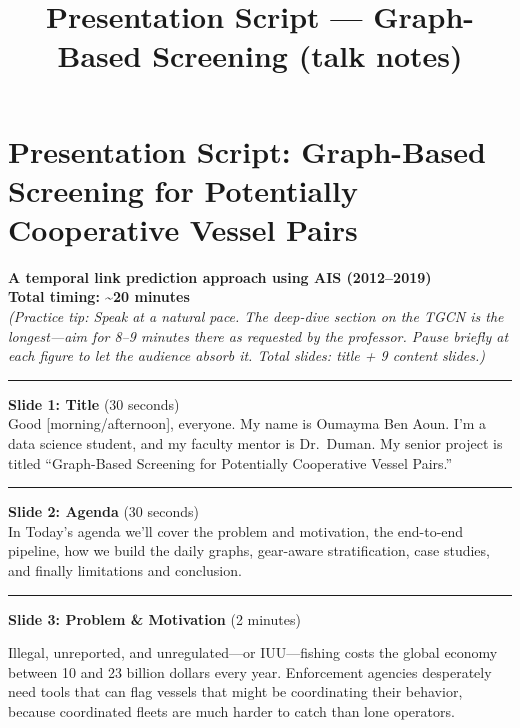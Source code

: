 \documentclass[
]{article}
\title{Presentation Script --- Graph-Based Screening (talk notes)}
\author{}
\date{}
\begin{document}
\maketitle

\section{Presentation Script: Graph-Based Screening for Potentially
Cooperative Vessel
Pairs}\label{presentation-script-graph-based-screening-for-potentially-cooperative-vessel-pairs}

\textbf{A temporal link prediction approach using AIS (2012--2019)}\\
\textbf{Total timing: \textasciitilde20 minutes}\\
\emph{(Practice tip: Speak at a natural pace. The deep-dive section on
the TGCN is the longest---aim for 8--9 minutes there as requested by the
professor. Pause briefly at each figure to let the audience absorb it.
Total slides: title + 9 content slides.)}

\begin{center}\rule{0.5\linewidth}{0.5pt}\end{center}

\textbf{Slide 1: Title} (30 seconds)\\
Good {[}morning/afternoon{]}, everyone. My name is Oumayma Ben Aoun. I'm
a data science student, and my faculty mentor is Dr.~Duman. My senior
project is titled ``Graph-Based Screening for Potentially Cooperative
Vessel Pairs.''

\begin{center}\rule{0.5\linewidth}{0.5pt}\end{center}

\textbf{Slide 2: Agenda} (30 seconds)\\
In Today's agenda we'll cover the problem and motivation, the end-to-end
pipeline, how we build the daily graphs, gear-aware stratification, case
studies, and finally limitations and conclusion.

\begin{center}\rule{0.5\linewidth}{0.5pt}\end{center}

\textbf{Slide 3: Problem \& Motivation} (2 minutes)

Illegal, unreported, and unregulated---or IUU---fishing costs the global
economy between 10 and 23 billion dollars every year. Enforcement
agencies desperately need tools that can flag vessels that might be
coordinating their behavior, because coordinated fleets are much harder
to catch than lone operators.
\end{document}
